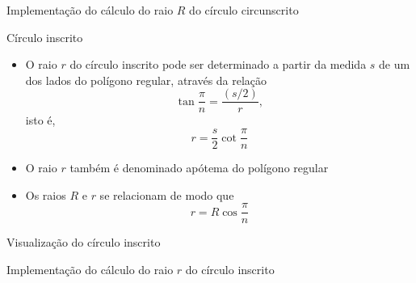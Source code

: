 \begin{frame}[fragile]{Implementação do cálculo do raio $R$ do círculo circunscrito}
\end{frame}

\begin{frame}[fragile]{Círculo inscrito}

    \begin{itemize}
        \item O raio $r$ do círculo inscrito pode ser determinado a partir da medida 
            $s$ de um dos lados do polígono regular, através da relação
        \[
            \tan \frac{\pi}{n} = \frac{(s/2)}{r},
        \]
        isto é,
        \[
            r = \frac{s}{2}\cot\frac{\pi}{n}
        \]

        \item O raio $r$ também é denominado apótema do polígono regular

        \item Os raios $R$ e $r$ se relacionam de modo que
        \[
            r = R\cos \frac{\pi}{n}
        \]
    \end{itemize}

\end{frame}

\begin{frame}[fragile]{Visualização do círculo inscrito}

    \def\R{3}

    \begin{figure}
    \end{figure}

\end{frame}

\begin{frame}[fragile]{Implementação do cálculo do raio $r$ do círculo inscrito}
\end{frame}


